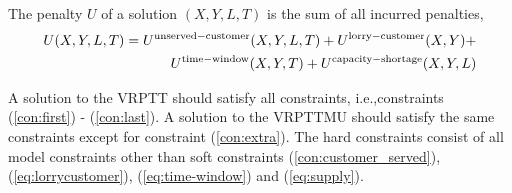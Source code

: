 The penalty $U$ of a solution $ (X,Y,L,T)$ is the sum of all incurred penalties,
\begin{align}
	U(X,Y,L,T) = U^{\rm unserved-customer}(X,Y,L,T) +
	U^{\rm lorry-customer}(X,Y) + \\
	U^{\rm time-window}(X,Y,T) +
	U^{\rm capacity-shortage}(X,Y,L) \notag
%
%
%
%
\end{align}


A solution to the VRPTT should satisfy all constraints, i.e.,constraints (\ref{con:first}) - (\ref{con:last}).
A solution to the VRPTTMU should satisfy the same constraints except for constraint (\ref{con:extra}).
The hard constraints consist of all model constraints other than soft constraints (\ref{con:customer_served}),(\ref{eq:lorrycustomer}), (\ref{eq:time-window}) and (\ref{eq:supply}).


